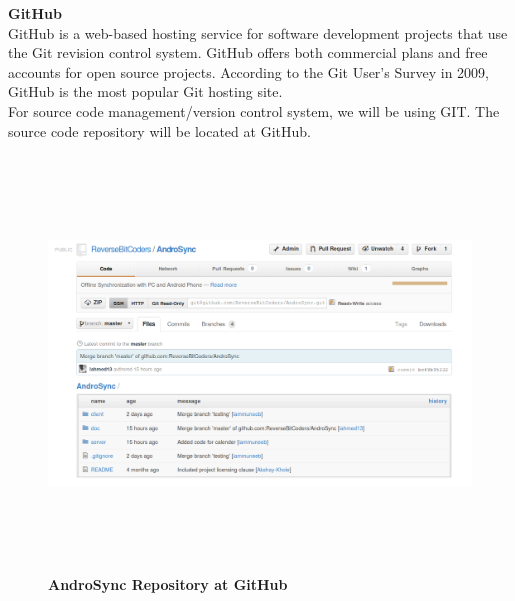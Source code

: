 \newpage
\textbf{GitHub}\\
\hspace*{0.82cm}GitHub is a web-based hosting service for software development projects that use the Git revision control system. GitHub offers 
both commercial plans and free accounts for open source projects. According to the Git User's Survey in 2009, GitHub is the most 
popular Git hosting site.\\[0.5cm]
\hspace*{0.82cm}For source code management/version control system, we will be using GIT. The source code repository will be located at GitHub.\\[2cm]

\begin{figure}[H]
  \centering
    \includegraphics[height= 11cm, width=17cm]{project/images/GitHub/github}
  \caption{\textbf{AndroSync Repository at GitHub}}
\end{figure}

